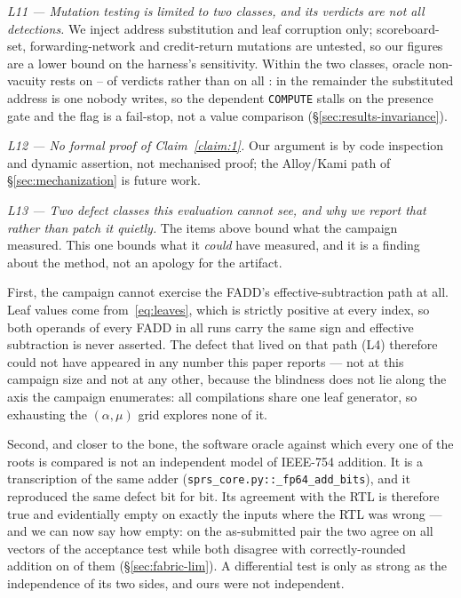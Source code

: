 \documentclass[journal,10pt]{IEEEtran}
\theoremstyle{plain}
\theoremstyle{definition}
\theoremstyle{remark}
\newcommand{\sv}[1]{\texttt{#1}}
\newcommand{\asgn}{\ensuremath{\alpha}}
\newcommand{\map}{\ensuremath{\mu}}
\begin{document}
\emph{L11 --- Mutation testing is limited to two classes, and its verdicts are
not all detections.} We inject address substitution and leaf corruption only;
scoreboard-set, forwarding-network and credit-return mutations are untested,
so our figures are a lower bound on the harness's sensitivity. Within the two
classes, oracle non-vacuity rests on \MutOracleLo{}--\MutOracleHi{} of
\MutTotal{} verdicts rather than on all \MutTotal{}: in the remainder the
substituted address is one nobody writes, so the dependent \texttt{COMPUTE}
stalls on the presence gate and the flag is a fail-stop, not a value
comparison (\S\ref{sec:results-invariance}).

\emph{L12 --- No formal proof of Claim~\ref{claim:1}.} Our argument is by code
inspection and dynamic assertion, not mechanised proof; the Alloy/Kami path of
\S\ref{sec:mechanization} is future work.

\emph{L13 --- Two defect classes this evaluation cannot see, and why we report
that rather than patch it quietly.} The items above bound what the campaign
measured. This one bounds what it \emph{could} have measured, and it is a
finding about the method, not an apology for the artifact.

First, the campaign cannot exercise the FADD's effective-subtraction path at
all. Leaf values come from~\eqref{eq:leaves}, which is strictly positive at
every index, so both operands of every FADD in all \WallTBs{} runs carry the
same sign and effective subtraction is never asserted. The defect that
lived on that path (L4) therefore could not have appeared in any number this
paper reports --- not at this
campaign size and not at any other, because the blindness does not lie along
the axis the campaign enumerates: all \CompileTotal{} compilations share one
leaf generator, so exhausting the $(\asgn,\map)$ grid explores none of it.

Second, and closer to the bone, the software oracle against which every one of
the \WallTBs{} roots is compared is not an independent model of IEEE-754
addition. It is a transcription of the same adder
(\sv{sprs\_core.py::\_fp64\_add\_bits}), and it reproduced the same defect bit
for bit. Its agreement with the RTL is therefore true and evidentially empty
on exactly the inputs where the RTL was wrong --- and we can now say how
empty: on the as-submitted pair the two agree on all \FpCtrlVectors{} vectors
of the acceptance test while both disagree with correctly-rounded addition on
\FpCtrlErrors{} of them (\S\ref{sec:fabric-lim}). A differential test is only
as strong as the independence of its two sides, and ours were not
independent.
\end{document}

